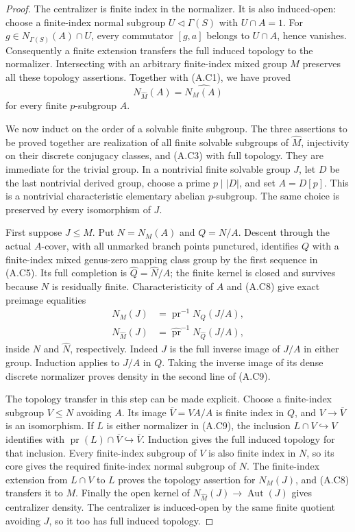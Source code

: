 \begin{proof}
The centralizer is finite index in the normalizer.  It is also
induced-open: choose a finite-index normal subgroup
$U\triangleleft\Gamma(S)$ with $U\cap A=1$.  For
$g\in N_{\Gamma(S)}(A)\cap U$, every commutator $[g,a]$
belongs to $U\cap A$, hence vanishes.  Consequently a finite
extension transfers the full induced topology to the normalizer.
Intersecting with an arbitrary finite-index mixed group $M$
preserves all these topology assertions.  Together with (A.C1),
we have proved
\[
 N_{\widehat M}(A)=\widehat{N_M(A)}
                                                        \tag{A.C8}
\]
for every finite $p$-subgroup $A$.

We now induct on the order of a solvable finite subgroup.  The
three assertions to be proved together are realization of all
finite solvable subgroups of $\widehat M$, injectivity on their
discrete conjugacy classes, and (A.C3) with full topology.  They
are immediate for the trivial group.  In a nontrivial finite
solvable group $J$, let $D$ be the last nontrivial derived group,
choose a prime $p\mid|D|$, and set $A=D[p]$.  This is a nontrivial
characteristic elementary abelian $p$-subgroup.  The same choice is
preserved by every isomorphism of $J$.

First suppose $J\leq M$.  Put $N=N_M(A)$ and $Q=N/A$.
Descent through the actual $A$-cover, with all unmarked branch
points punctured, identifies $Q$ with a finite-index mixed
genus-zero mapping class group by the first sequence in (A.C5).
Its full completion is $\widehat Q=\widehat N/A$; the finite
kernel is closed and survives because $N$ is residually finite.
Characteristicity of $A$ and (A.C8) give exact preimage equalities
\[
\begin{split}
 N_M(J)&=\operatorname{pr}^{-1}N_Q(J/A),\\
 N_{\widehat M}(J)&=\widehat{\operatorname{pr}}^{-1}
                         N_{\widehat Q}(J/A),
\end{split}                                                  \tag{A.C9}
\]
inside $N$ and $\widehat N$, respectively.  Indeed $J$ is the
full inverse image of $J/A$ in either group.  Induction applies
to $J/A$ in $Q$.  Taking the inverse image of its dense discrete
normalizer proves density in the second line of (A.C9).

The topology transfer in this step can be made explicit.  Choose
a finite-index subgroup $V\leq N$ avoiding $A$.  Its image
$\overline V=VA/A$ is finite index in $Q$, and $V\to\overline V$
is an isomorphism.  If $L$ is either normalizer in (A.C9),
the inclusion $L\cap V\hookrightarrow V$ identifies with
$\operatorname{pr}(L)\cap\overline V\hookrightarrow\overline V$.
Induction gives the full induced topology for that inclusion.
Every finite-index subgroup of $V$ is also finite index in $N$,
so its core gives the required finite-index normal subgroup of
$N$.  The finite-index extension from $L\cap V$ to $L$ proves
the topology assertion for $N_M(J)$, and (A.C8) transfers it to
$M$.  Finally the open kernel of
$N_{\widehat M}(J)\to\operatorname{Aut}(J)$ gives centralizer
density.  The centralizer is induced-open by the same finite
quotient avoiding $J$, so it too has full induced topology.


\end{proof}
